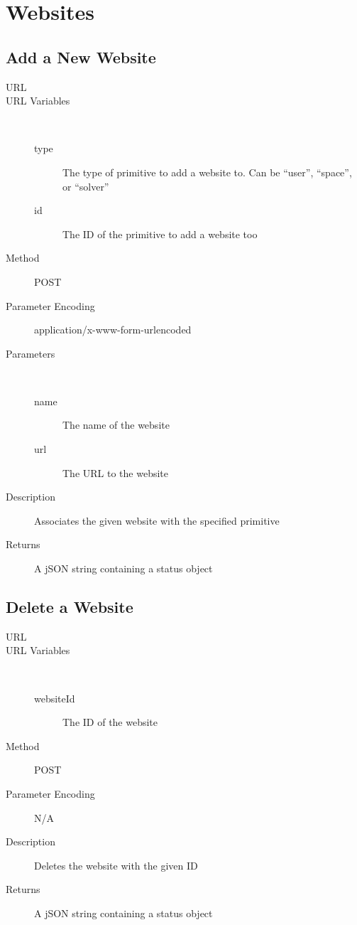 \chapter{Websites}

\section{Add a New Website}
\begin{description}
\item [URL] 
\item [URL Variables] \
	\begin{description}
	\item [type]  The type of primitive to add a website to. Can be “user”, “space”, or “solver”
	\item [id] \type{Integer} The ID of the primitive to add a website too
	\end{description}
\item [Method] POST
\item [Parameter Encoding] application/x-www-form-urlencoded
\item [Parameters] \
	\begin{description}
	\item [name]  The name of the website
	\item [url]  The URL to the website
	\end{description}
\item [Description] Associates the given website with the specified primitive
\item [Returns] A jSON string containing a status object
\end{description}


\section{Delete a Website}
\begin{description}
\item [URL] 
\item [URL Variables] \
	\begin{description}
	\item [websiteId] \type{Integer} The ID of the website
	\end{description}
\item [Method] POST
\item [Parameter Encoding] N/A
\item [Description] Deletes the website with the given ID
\item [Returns] A jSON string containing a status object
\end{description}
